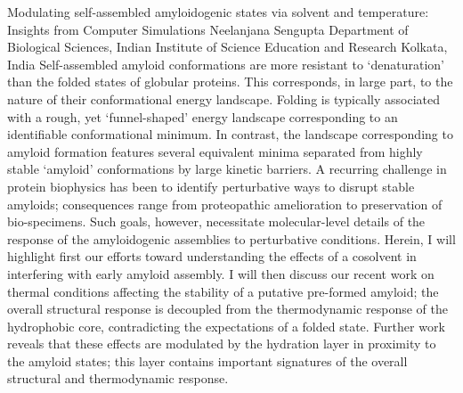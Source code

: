 
    \begin{abstract_online}{Modulating self-assembled amyloidogenic states via solvent and temperature: Insights from Computer Simulations}{%
        Neelanjana Sengupta}{%
        \IStag}{%
        Department of Biological Sciences, Indian Institute of Science Education and Research Kolkata, India}
    Self-assembled amyloid conformations are more resistant to ‘denaturation’ than the folded states of globular proteins. This corresponds, in large part, to the nature of their conformational energy landscape. Folding is typically associated with a rough, yet ‘funnel-shaped’ energy landscape corresponding to an identifiable conformational minimum. In contrast, the landscape corresponding to amyloid formation features several equivalent minima separated from highly stable ‘amyloid’ conformations by large kinetic barriers. A recurring challenge in protein biophysics has been to identify perturbative ways to disrupt stable amyloids; consequences range from proteopathic amelioration to preservation of bio-specimens. Such goals, however, necessitate molecular-level details of the response of the amyloidogenic assemblies to perturbative conditions. Herein, I will highlight first our efforts toward understanding the effects of a cosolvent in interfering with early amyloid assembly. I will then discuss our recent work on thermal conditions affecting the stability of a putative pre-formed amyloid; the overall structural response is decoupled from the thermodynamic response of the hydrophobic core, contradicting the expectations of a folded state. Further work reveals that these effects are modulated by the hydration layer in proximity to the amyloid states; this layer contains important signatures of the overall structural and thermodynamic response. 
    
    \end{abstract_online}
    